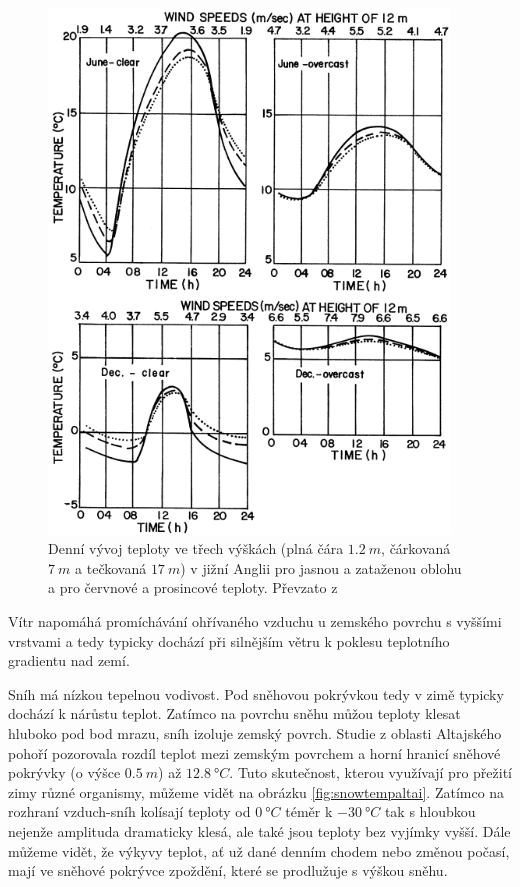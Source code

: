 \begin{figure}
	\centering
	\includegraphics[width=0.95\textwidth]{img/ch1/diurnaltemp.png}
	\caption{Denní vývoj teploty ve třech výškách (plná čára $\SI{1.2}{m}$, čárkovaná $\SI{7}{m}$ a tečkovaná $\SI{17}{m}$) v jižní Anglii pro jasnou a zataženou oblohu a pro červnové a prosincové teploty. Převzato z \cite{arya2001}}
	\label{fig:diurnaltemp}
\end{figure}

Vítr napomáhá promíchávání ohřívaného vzduchu u zemského povrchu s vyššími vrstvami a tedy typicky dochází při silnějším větru k poklesu teplotního gradientu nad zemí\cite{arya2001}.

Sníh má nízkou tepelnou vodivost. Pod sněhovou pokrývkou tedy v zimě typicky dochází k nárůstu teplot. Zatímco na povrchu sněhu můžou teploty klesat hluboko pod bod mrazu, sníh izoluje zemský povrch. Studie z oblasti Altajského pohoří pozorovala rozdíl teplot mezi zemským povrchem a horní hranicí sněhové pokrývky (o výšce $\SI{0.5}{m}$) až $\SI{12.8}{\degree C}$. Tuto skutečnost, kterou využívají pro přežití zimy různé organismy\cite{hirakawahirofumi2018}, můžeme vidět na obrázku \ref{fig:snowtempaltai}. Zatímco na rozhraní vzduch-sníh kolísají teploty od $\SI{0}{\degree C}$ téměr k $\SI{-30}{\degree C}$ tak s hloubkou nejenže amplituda dramaticky klesá, ale také jsou teploty bez vyjímky vyšší. Dále můžeme vidět, že výkyvy teplot, ať už dané denním chodem nebo změnou počasí, mají ve sněhové pokrývce zpoždění, které se prodlužuje s výškou sněhu\cite{zhangwei2021}. 

